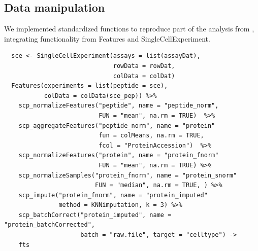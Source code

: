 \documentclass{article}
\newcommand{\hcode}[2][lgray]{{\ttfamily\color{vdgray}\colorbox{#1}{#2}}}
\begin{document}
\begin{multicols}{2}
\begin{minipage}[t]{\linewidth}
  \section*{\huge Data manipulation}
  \large
  We implemented standardized functions to reproduce part of the analysis from \cite{Specht2019-jm}, integrating functionality from \hcode{Features} and \hcode{SingleCellExperiment}.
  \begin{lstlisting}
  sce <- SingleCellExperiment(assays = list(assayDat), 
                              rowData = rowDat,
                              colData = colDat)
  Features(experiments = list(peptide = sce), 
           colData = colData(sce_pep)) %>%
    scp_normalizeFeatures("peptide", name = "peptide_norm",
                          FUN = "mean", na.rm = TRUE)  %>%
    scp_aggregateFeatures("peptide_norm", name = "protein"
                          fun = colMeans, na.rm = TRUE,
                          fcol = "ProteinAccession")  %>%
    scp_normalizeFeatures("protein", name = "protein_fnorm"
                          FUN = "mean", na.rm = TRUE) %>%
    scp_normalizeSamples("protein_fnorm", name = "protein_snorm"
                         FUN = "median", na.rm = TRUE, ) %>%
    scp_impute("protein_fnorm", name = "protein_imputed"
               method = KNNimputation, k = 3) %>%
    scp_batchCorrect("protein_imputed", name = "protein_batchCorrected",
                     batch = "raw.file", target = "celltype") -> 
    fts
  \end{lstlisting}
\end{minipage}

\noindent
\begin{minipage}[t]{\linewidth}
  \vspace{0.5cm}

\end{minipage}
\end{multicols}
\end{document}
